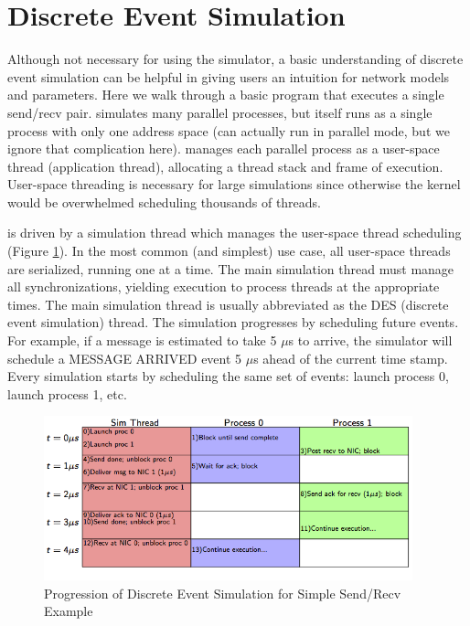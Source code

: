 
\section{Discrete Event Simulation}
\label{sec:tutorial:des}
Although not necessary for using the simulator, a basic understanding of discrete event simulation can be helpful in giving users an intuition for network models and parameters.
Here we walk through a basic program that executes a single send/recv pair.
\sstmacro simulates many parallel processes, but itself runs as a single process with only one address space (\sstmacro can actually run in parallel mode, but we ignore that complication here).
\sstmacro manages each parallel process as a user-space thread (application thread), allocating a thread stack and frame of execution.
User-space threading is necessary for large simulations since otherwise the kernel would be overwhelmed scheduling thousands of threads.

\sstmacro is driven by a simulation thread which manages the user-space thread scheduling (Figure \ref{fig:des}).
In the most common (and simplest) use case, all user-space threads are serialized, running one at a time.
The main simulation thread must manage all synchronizations, yielding execution to process threads at the appropriate times.
The main simulation thread is usually abbreviated as the DES (discrete event simulation) thread.
The simulation progresses by scheduling future events.  
For example, if a message is estimated to take 5 $\mu$s to arrive,
the simulator will schedule a MESSAGE ARRIVED event 5 $\mu$s ahead of the current time stamp.
Every simulation starts by scheduling the same set of events: launch process 0, launch process 1, etc.

\begin{figure}[h!]
\centering
\includegraphics[width=0.95\textwidth]{figures/tikz/des/events.png}
\caption{Progression of Discrete Event Simulation for Simple Send/Recv Example}
\label{fig:des}
\end{figure}

